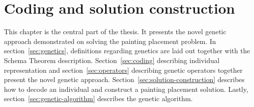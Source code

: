 \chapter{Coding and solution construction}\label{ch:coding-and-solution-construction}

This chapter is the central part of the thesis.
It presents the novel genetic approach demonstrated on solving the painting placement problem.
In section~\ref{sec:genetics}, definitions regarding genetics are laid out together with the Schema Theorem description.
Section~\ref{sec:coding} describing individual representation and section~\ref{sec:operators}
describing genetic operators together present the novel genetic approach.
Section~\ref{sec:solution-construction} describes how to decode an individual and construct a painting placement solution.
Lastly, section~\ref{sec:genetic-algorithm} describes the genetic algorithm.







